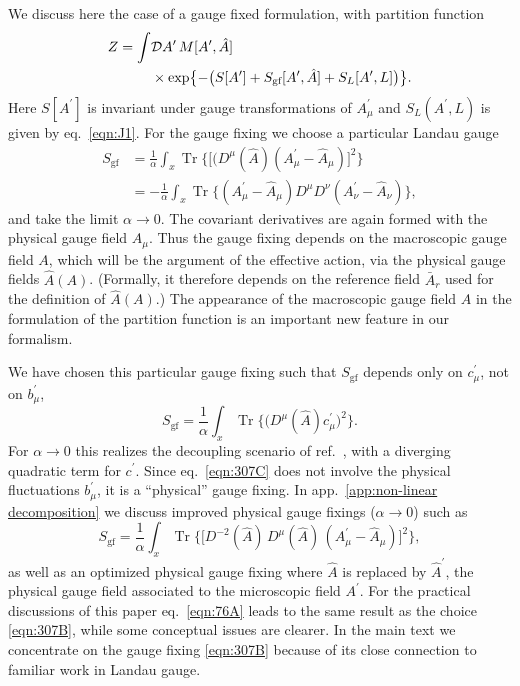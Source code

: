 \documentclass[twocolumn,aps,prd,amsmath,amssymb,preprintnumbers,longbibliography]{revtex4-1}
\numberwithin{equation}{section}
\DeclareMathOperator{\Tr}{Tr}
\newenvironment{alignedeqn}{\begin{equation}\begin{aligned}}{\end{aligned}\end{equation}\ignorespacesafterend}
\begin{document}
We discuss here the case of a gauge fixed formulation, with partition function
\begin{align}\label{eqn:307A}
	Z
	= \int& \mathcal{D} A^\prime \, M[A^\prime,\hat{A}]\\
	&\times\exp \bigl\{-\bigl(S[A^\prime] + S_\text{gf}[A^\prime,\hat{A}] + S_L[A^\prime,L]\bigr)\bigr\}.\notag
\end{align}
Here $S[A^\prime]$ is invariant under gauge transformations of $A_\mu^\prime$ and $S_L(A^\prime,L)$ is given by eq.~\eqref{eqn:J1}. For the gauge fixing we choose a particular Landau gauge
\begin{alignedeqn}\label{eqn:307B}
	S_\text{gf}
	&= \frac{1}{\alpha} \int_x \Tr\bigl\{\bigl[(D^\mu(\hat{A})(A_\mu^\prime - \hat{A}_\mu)\bigr]^2\bigr\}\\
	&= -\frac{1}{\alpha} \int_x \Tr\big \{(A_\mu^\prime -\hat{A}_\mu) D^\mu D^\nu (A_\nu^\prime - \hat{A}_\nu)\bigr\},
\end{alignedeqn}
and take the limit $\alpha \to 0$. The covariant derivatives are again formed with the physical gauge field $\hat{A}_\mu$. Thus the gauge fixing depends on the macroscopic gauge field $A$, which will be the argument of the effective action, via the physical gauge fields $\hat{A}(A)$. (Formally, it therefore depends on the reference field $\bar{A}_r$ used for the definition of $\hat{A}(A)$.) The appearance of the macroscopic gauge field $A$ in the formulation of the partition function is an important new feature in our formalism.

We have chosen this particular gauge fixing such that $S_\text{gf}$ depends only on $c^\prime_\mu$, not on $b^\prime_\mu$,
\begin{equation}\label{eqn:307C}
	S_\text{gf}
	= \frac{1}{\alpha} \int_x \Tr\bigl\{\bigl(D^\mu(\hat{A})c^\prime_\mu\bigr)^2\bigr\}.
\end{equation}
For $\alpha \to 0$ this realizes the decoupling scenario of ref.~\cite{CWGD}, with a diverging quadratic term for $c^\prime$. Since eq.~\eqref{eqn:307C} does not involve the physical fluctuations $b_\mu^\prime$, it is a ``physical'' gauge fixing. In app.~\ref{app:non-linear decomposition} we discuss improved physical gauge fixings ($\alpha \to 0$) such as
\begin{equation}\label{eqn:76A}
	S_\text{gf}
	= \frac{1}{\alpha} \int_x \Tr\bigl\{\bigl[D^{-2}(\hat{A}) \, D^\mu(\hat{A}) \, (A_\mu^\prime - \hat{A}_\mu)\bigr]^2\bigr\},
\end{equation}
as well as an optimized physical gauge fixing where $\hat{A}$ is replaced by $\hat{A}^\prime$, the physical gauge field associated to the microscopic field $A^\prime$. For the practical discussions of this paper eq.~\eqref{eqn:76A} leads to the same result as the choice \eqref{eqn:307B}, while some conceptual issues are clearer. In the main text we concentrate on the gauge fixing \eqref{eqn:307B} because of its close connection to familiar work in Landau gauge.
\end{document}
